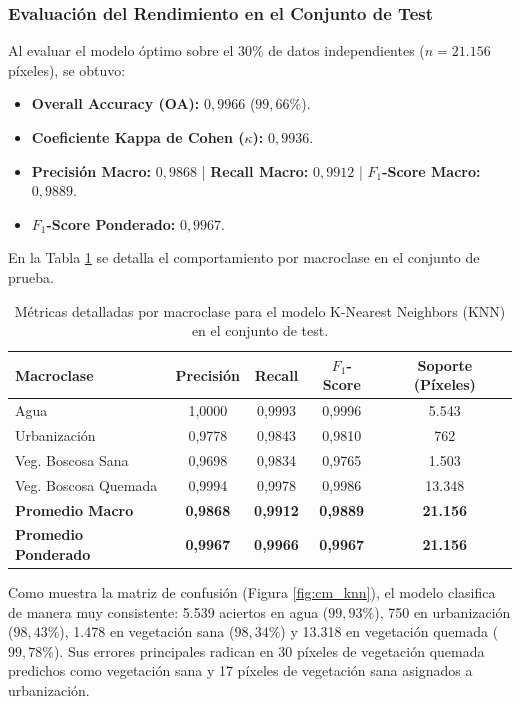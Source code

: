 \documentclass[12pt]{article}
\begin{document}
\subsubsection{Evaluación del Rendimiento en el Conjunto de Test}
Al evaluar el modelo óptimo sobre el 30\% de datos independientes ($n = 21.156$ píxeles), se obtuvo:
\begin{itemize}
    \item \textbf{Overall Accuracy (OA):} $0{,}9966$ ($99{,}66\%$).
    \item \textbf{Coeficiente Kappa de Cohen ($\kappa$):} $0{,}9936$.
    \item \textbf{Precisión Macro:} $0{,}9868$ | \textbf{Recall Macro:} $0{,}9912$ | \textbf{$F_1$-Score Macro:} $0{,}9889$.
    \item \textbf{$F_1$-Score Ponderado:} $0{,}9967$.
\end{itemize}

En la Tabla \ref{tab:reporte_knn} se detalla el comportamiento por macroclase en el conjunto de prueba.

\begin{table}[H]
    \centering
    \caption{Métricas detalladas por macroclase para el modelo K-Nearest Neighbors (KNN) en el conjunto de test.}
    \label{tab:reporte_knn}
    \begin{tabular}{@{}lcccc@{}}
        \toprule
        \textbf{Macroclase} & \textbf{Precisión} & \textbf{Recall} & \textbf{$F_1$-Score} & \textbf{Soporte (Píxeles)} \\
        \midrule
        Agua & 1,0000 & 0,9993 & 0,9996 & 5.543 \\
        Urbanización & 0,9778 & 0,9843 & 0,9810 & 762 \\
        Veg. Boscosa Sana & 0,9698 & 0,9834 & 0,9765 & 1.503 \\
        Veg. Boscosa Quemada & 0,9994 & 0,9978 & 0,9986 & 13.348 \\
        \midrule
        \textbf{Promedio Macro} & \textbf{0,9868} & \textbf{0,9912} & \textbf{0,9889} & \textbf{21.156} \\
        \textbf{Promedio Ponderado} & \textbf{0,9967} & \textbf{0,9966} & \textbf{0,9967} & \textbf{21.156} \\
        \bottomrule
    \end{tabular}
\end{table}

Como muestra la matriz de confusión (Figura \ref{fig:cm_knn}), el modelo clasifica de manera muy consistente: 5.539 aciertos en agua ($99{,}93\%$), 750 en urbanización ($98{,}43\%$), 1.478 en vegetación sana ($98{,}34\%$) y 13.318 en vegetación quemada ($99{,}78\%$). Sus errores principales radican en 30 píxeles de vegetación quemada predichos como vegetación sana y 17 píxeles de vegetación sana asignados a urbanización.
\end{document}
